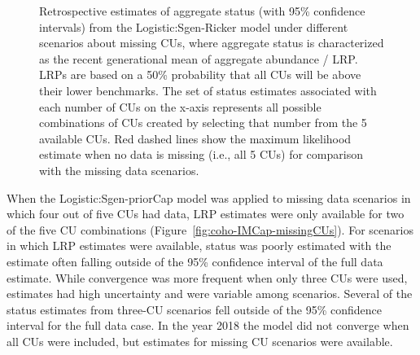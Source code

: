 \documentclass[11pt]{book}
\begin{document}
\begin{figure}[htb]

{\centering {} 

}

\caption{Retrospective estimates of aggregate status (with 95\% confidence intervals) from the Logistic:Sgen-Ricker  model under different scenarios about missing CUs, where aggregate status is characterized as the recent generational mean of aggregate abundance / LRP. LRPs are based on a 50\% probability that all CUs will be above their lower benchmarks. The set of status estimates associated with each number of CUs on the x-axis represents all possible combinations of CUs created by selecting that number from the 5 available CUs.  Red dashed lines show the maximum likelihood estimate when no data is missing (i.e., all 5 CUs) for comparison with the missing data scenarios.}\label{fig:coho-IM-missingCUs}
\end{figure}
\linebreak

When the Logistic:Sgen-priorCap model was applied to missing data scenarios in which four out of five CUs had data, LRP estimates were only available for two of the five CU combinations (Figure~\ref{fig:coho-IMCap-missingCUs}). For scenarios in which LRP estimates were available, status was poorly estimated with the estimate often falling outside of the 95\% confidence interval of the full data estimate. While convergence was more frequent when only three CUs were used, estimates had high uncertainty and were variable among scenarios. Several of the status estimates from three-CU scenarios fell outside of the 95\% confidence interval for the full data case. In the year 2018 the model did not converge when all CUs were included, but estimates for missing CU scenarios were available.
\end{document}

